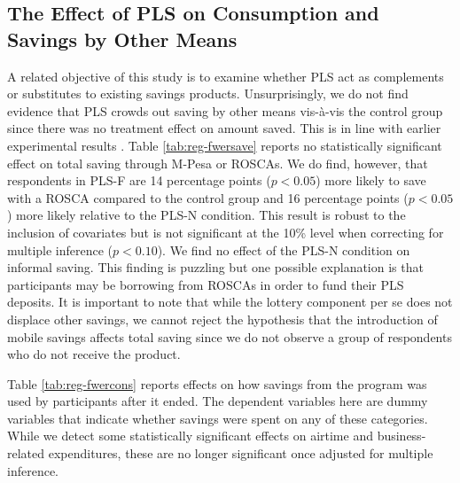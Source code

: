 \documentclass[12pt]{article}
\begin{document}

	\subsection{The Effect of PLS on Consumption and Savings by Other Means}

		A related objective of this study is to examine whether PLS act as complements or substitutes to existing savings products. Unsurprisingly, we do not find evidence that PLS crowds out saving by other means vis-\`{a}-vis the control group since there was no treatment effect on amount saved. This is in line with earlier experimental results \parencite{atalay_savings_2014,filiz-ozbay_lottery_2015,dizon_leveraging_2016}. Table \ref{tab:reg-fwersave} reports no statistically significant effect on total saving through M-Pesa or ROSCAs. We do find, however, that respondents in PLS-F are 14 percentage points ($p < 0.05$) more likely to save with a ROSCA compared to the control group and 16 percentage points ($p < 0.05$) more likely relative to the PLS-N condition. This result is robust to the inclusion of covariates but is not significant at the 10\% level when correcting for multiple inference ($p < 0.10$). We find no effect of the PLS-N condition on informal saving. This finding is puzzling but one possible explanation is that participants may be borrowing from ROSCAs in order to fund their PLS deposits. It is important to note that while the lottery component per se does not displace other savings, we cannot reject the hypothesis that the introduction of mobile savings affects total saving since we do not observe a group of respondents who do not receive the product.

		

		Table \ref{tab:reg-fwercons} reports effects on how savings from the program was used by participants after it ended. The dependent variables here are dummy variables that indicate whether savings were spent on any of these categories. While we detect some statistically significant effects on airtime and business-related expenditures, these are no longer significant once adjusted for multiple inference.
\end{document}
